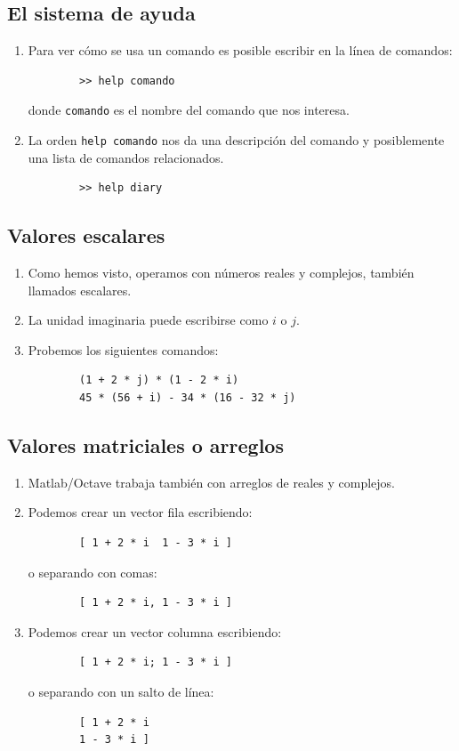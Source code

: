 \subsection{El sistema de ayuda}

\begin{enumerate}
	\item Para ver cómo se usa un comando es posible escribir en la línea de comandos:
	\begin{verbatim}
		>> help comando
	\end{verbatim}
	donde \texttt{comando} es el nombre del comando que nos interesa.
	
	\item La orden \texttt{help comando} nos da una descripción del comando y posiblemente una lista de comandos relacionados.
	\begin{verbatim}
		>> help diary
	\end{verbatim}
\end{enumerate}

\subsection{Valores escalares}

\begin{enumerate}
	\item Como hemos visto, operamos con números reales y complejos, también llamados escalares.
	\item La unidad imaginaria puede escribirse como $i$ o $j$.
	\item Probemos los siguientes comandos:
	\begin{verbatim}
		(1 + 2 * j) * (1 - 2 * i)
		45 * (56 + i) - 34 * (16 - 32 * j)
	\end{verbatim}
\end{enumerate}

\subsection{Valores matriciales o arreglos}

\begin{enumerate}
	\item Matlab/Octave trabaja también con arreglos de reales y complejos.
	\item Podemos crear un vector fila escribiendo:
	\begin{verbatim}
		[ 1 + 2 * i  1 - 3 * i ]
	\end{verbatim}
	o separando con comas:
	\begin{verbatim}
		[ 1 + 2 * i, 1 - 3 * i ]
	\end{verbatim}
	
	\item Podemos crear un vector columna escribiendo:
	\begin{verbatim}
		[ 1 + 2 * i; 1 - 3 * i ]
	\end{verbatim}
	o separando con un salto de línea:
	\begin{verbatim}
		[ 1 + 2 * i
		1 - 3 * i ]
	\end{verbatim}
\end{enumerate}

